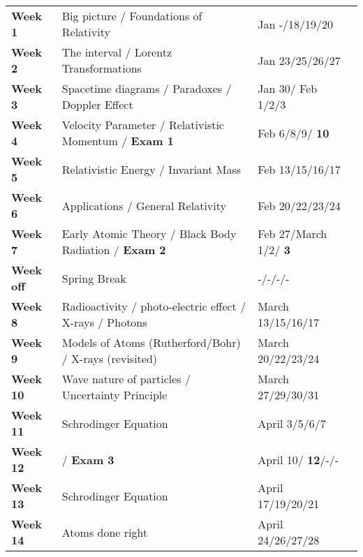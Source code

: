 \documentclass[margin,line]{res}
\newcommand\inRed[1]{{\color{red}  \textbf{#1}}}
\begin{document}
\begin{resume}
\begin{tabular}{llll}
\textbf{Week 1}   & Big picture / Foundations of Relativity        & Jan -/18/19/20 & \\
\textbf{Week 2}   & The interval / Lorentz Transformations         & Jan 23/25/26/27 & \\
\textbf{Week 3}   & Spacetime diagrams / Paradoxes / Doppler Effect        & Jan 30/ Feb 1/2/3 & \\
\textbf{Week 4}   & Velocity Parameter / Relativistic Momentum / \inRed{Exam 1}    & Feb 6/8/9/\inRed{10} & \\
\textbf{Week 5}   & Relativistic Energy / Invariant Mass                  & Feb 13/15/16/17 & \\
\textbf{Week 6}   & Applications / General Relativity                     & Feb 20/22/23/24 & \\
\textbf{Week 7}   & Early Atomic Theory / Black Body Radiation / \inRed{Exam 2}       & Feb 27/March 1/2/ \inRed{3} & \\
\textbf{Week off} &  Spring Break                              & -/-/-/- & \\
\textbf{Week 8}   & Radioactivity / photo-electric effect / X-rays / Photons   & March 13/15/16/17 & \\
\textbf{Week 9}   &  Models of Atoms (Rutherford/Bohr) / X-rays (revisited)      & March 20/22/23/24 & \\
\textbf{Week 10}  &  Wave nature of particles / Uncertainty Principle                                     & March 27/29/30/31 & \\
\textbf{Week 11}  &  Schrodinger Equation                  & April 3/5/6/7 & \\
\textbf{Week 12}  &   /  \inRed{Exam 3}           & April 10/\inRed{12}/-/- & \\
\textbf{Week 13}  &  Schrodinger Equation                      & April 17/19/20/21 & \\
\textbf{Week 14}  &  Atoms done right                          & April 24/26/27/28 & \\
\end{tabular}

\end{resume}
\end{document}
